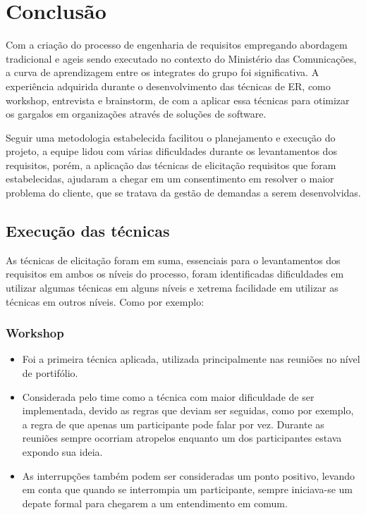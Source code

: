 \chapter[Conclusão]{Conclusão}

Com a criação do processo de engenharia de requisitos empregando abordagem tradicional e ageis
sendo executado no contexto do Ministério das Comunicações, a curva
de aprendizagem entre os integrates do grupo foi significativa. A experiência adquirida durante
o desenvolvimento das técnicas de ER, como workshop, entrevista e brainstorm, de com a aplicar
essa técnicas para otimizar os gargalos em organizações através de soluções de software.

Seguir uma metodologia  estabelecida facilitou o planejamento e execução do projeto,
a equipe lidou com várias dificuldades durante os levantamentos dos requisitos, porém,
a aplicação das técnicas de elicitação requisitos que foram estabelecidas, ajudaram a chegar
em um consentimento em resolver o maior problema do cliente, que se tratava da gestão de demandas
a serem desenvolvidas.

\section{Execução das técnicas}

As técnicas de elicitação foram em suma, essenciais para o levantamentos dos requisitos
em ambos os  níveis do processo, foram identificadas dificuldades em utilizar algumas
técnicas em alguns níveis e xetrema facilidade em utilizar as técnicas em outros níveis.
Como por exemplo:

\subsection{Workshop}
\begin{itemize}
  \item Foi a primeira técnica aplicada, utilizada principalmente nas reuniões no nível de portifólio.
  \item Considerada pelo time como a técnica com maior dificuldade de ser implementada, devido as regras que deviam ser seguidas, como por exemplo, a regra de que apenas um participante pode falar por vez. Durante as reuniões sempre ocorriam atropelos enquanto um dos participantes estava expondo sua ideia.
  \item As interrupções também podem ser consideradas um ponto positivo, levando em conta que quando se interrompia um participante, sempre iniciava-se um depate formal para chegarem a um entendimento em comum.
\end{itemize}

